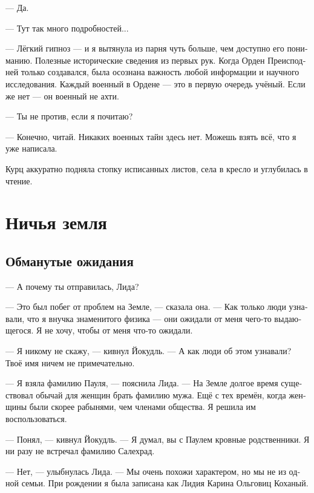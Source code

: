 \documentclass[a4paper,12pt,fleqn]{book}\usepackage{polyglossia}\setdefaultlanguage[babelshorthands=true]{russian}\setotherlanguage{english}\defaultfontfeatures{Ligatures=TeX,Mapping=tex-text}\usepackage{xcolor}\newcommand{\ml}[3]{#2}
\begin{document}
--- Да.

--- Тут так много подробностей...

--- Лёгкий гипноз --- и я вытянула из парня чуть больше, чем доступно его пониманию.
Полезные исторические сведения из первых рук.
Когда Орден Преисподней только создавался, была осознана важность любой информации и научного исследования.
\ml{$0$}
{Каждый военный в Ордене --- это в первую очередь учёный.}
{Every military in the Order is a scientist in the first place.}
\ml{$0$}
{Если же нет --- он военный не ахти.}
{Otherwise, they're not much of a military.''}

\ml{$0$}
{--- Ты не против, если я почитаю?}
{``Would you mind if I read?''}

--- Конечно, читай.
Никаких военных тайн здесь нет.
Можешь взять всё, что я уже написала.

Курц аккуратно подняла стопку исписанных листов, села в кресло и углубилась в чтение.

\chapter{Ничья земля}

\section{Обманутые ожидания}

--- А почему ты отправилась, Лида?

--- Это был побег от проблем на Земле, --- сказала она.
--- Как только люди узнавали, что я внучка знаменитого физика --- они ожидали от меня чего-то выдающегося.
Я не хочу, чтобы от меня что-то ожидали.

--- Я никому не скажу, --- кивнул Йокудль.
--- А как люди об этом узнавали?
Твоё имя ничем не примечательно.

--- Я взяла фамилию Пауля, --- пояснила Лида.
--- На Земле долгое время существовал обычай для женщин брать фамилию мужа.
Ещё с тех времён, когда женщины были скорее рабынями, чем членами общества.
Я решила им воспользоваться.

--- Понял, --- кивнул Йокудль.
--- Я думал, вы с Паулем кровные родственники.
Я ни разу не встречал фамилию Салехрад. %

--- Нет, --- улыбнулась Лида.
--- Мы очень похожи характером, но мы не из одной семьи.
\ml{$0$}
{При рождении я была записана как Лидия Карина Ольговиц Коханый.}
{At birth I was registered as Lidia Karina Olgowitz Kochany.''}
\end{document}
